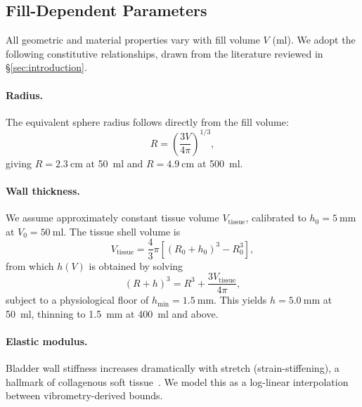\subsection{Fill-Dependent Parameters}
\label{sec:fill}

All geometric and material properties vary with fill volume $V$
(\si{\milli\litre}).  We adopt the following constitutive relationships,
drawn from the literature reviewed in \S\ref{sec:introduction}.

\paragraph{Radius.}
The equivalent sphere radius follows directly from the fill volume:
\begin{equation}\label{eq:radius}
  R = \left(\frac{3V}{4\pi}\right)^{1/3},
\end{equation}
giving $R = \SI{2.3}{\centi\metre}$ at \SI{50}{\milli\litre} and
$R = \SI{4.9}{\centi\metre}$ at \SI{500}{\milli\litre}.

\paragraph{Wall thickness.}
We assume approximately constant tissue volume $V_\mathrm{tissue}$,
calibrated to $h_0 = \SI{5}{\milli\metre}$ at $V_0 = \SI{50}{\milli\litre}$.
The tissue shell volume is
\begin{equation}\label{eq:tissue_vol}
  V_\mathrm{tissue} = \frac{4}{3}\pi\left[(R_0 + h_0)^3 - R_0^3\right],
\end{equation}
from which $h(V)$ is obtained by solving
\begin{equation}\label{eq:h_solve}
  (R + h)^3 = R^3 + \frac{3 V_\mathrm{tissue}}{4\pi},
\end{equation}
subject to a physiological floor of $h_\mathrm{min} = \SI{1.5}{\milli\metre}$.
This yields $h = \SI{5.0}{\milli\metre}$ at \SI{50}{\milli\litre}, thinning
to \SI{1.5}{\milli\metre} at \SI{400}{\milli\litre} and above.

\paragraph{Elastic modulus.}
Bladder wall stiffness increases dramatically with stretch (strain-stiffening),
a hallmark of collagenous soft tissue~\cite{Fung1993}.  We model this as a
log-linear interpolation between vibrometry-derived bounds.

